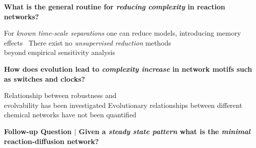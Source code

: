 \documentclass[a0,portrait]{a0poster}
\begin{document}
\begin{multicols}{2}

\begin{tcolorbox}[boxrule=2pt,arc=3.4pt,boxsep=2mm]
	\begin{center}
		\textbf{
		What is the general routine for \textit{reducing complexity} in reaction networks?}
	\end{center}
\end{tcolorbox}

\begin{itemize}[leftmargin=3cm]
	\up For \textit{known time-scale separations} one can reduce models, introducing memory effects~\cite{Phillies2000ProjectionFormalism}
	\down There exist no \textit{unsupervised reduction} methods\\beyond
	empirical sensitivity analysis
\end{itemize}

\vfill
\columnbreak

\begin{tcolorbox}[boxrule=2pt,arc=3.4pt,boxsep=2mm]
	\begin{center}
		\textbf{
		How does evolution lead to \textit{complexity increase} in network motifs such as switches and clocks?}
	\end{center}
\end{tcolorbox}

\begin{itemize}[leftmargin=3cm]
	\up Relationship between robustness and \\evolvability has been investigated \cite{Daniels2008SloppinessBiology}
	\down Evolutionary relationships between different chemical networks have not been quantified
\end{itemize}

\vfill
\end{multicols}
\vspace{1cm}

\begin{tcolorbox}[boxrule=2pt,arc=3.4pt,boxsep=2mm]
	\begin{center}
		\textbf{\color{Grey}Follow-up Question \color{Black}$|$
		Given a \textit{steady state pattern} what is the \textit{minimal} reaction-diffusion network?}
	\end{center}
\end{tcolorbox}
\end{document}
